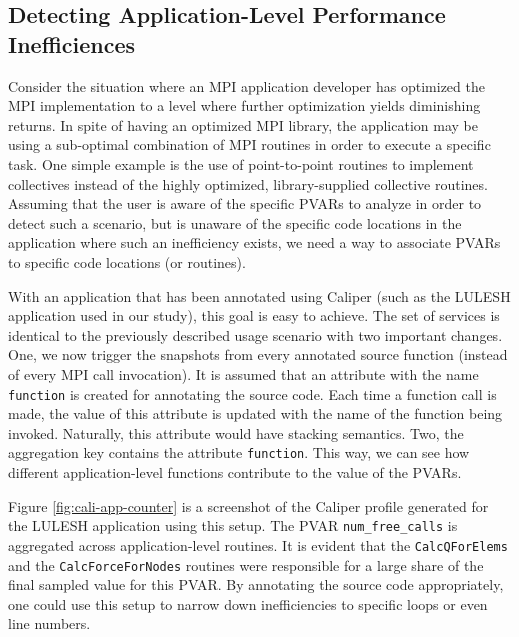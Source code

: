 \subsection{Detecting Application-Level Performance Inefficiences}
Consider the situation where an MPI application developer has optimized the MPI implementation to a level where further optimization yields diminishing returns. In spite of having an optimized MPI library, the application may be using a sub-optimal combination of MPI routines in order to execute a specific task. One simple example is the use of point-to-point routines to implement collectives instead of the highly optimized, library-supplied collective routines. Assuming that the user is aware of the specific PVARs to analyze in order to detect such a scenario, but is unaware of the specific code locations in the application where such an inefficiency exists, we need a way to associate PVARs to specific code locations (or routines).
\par With an application that has been annotated using Caliper (such as the LULESH application used in our study), this goal is easy to achieve. The set of services is identical to the previously described usage scenario with two important changes. One, we now trigger the snapshots from every annotated source function (instead of every MPI call invocation). It is assumed that an attribute with the name \verb+function+ is created for annotating the source code. Each time a function call is made, the value of this attribute is updated with the name of the function being invoked. Naturally, this attribute would have stacking semantics. Two, the aggregation key contains the attribute \verb+function+. This way, we can see how different application-level functions contribute to the value of the PVARs. 
\par Figure \ref{fig:cali-app-counter} is a screenshot of the Caliper profile generated for the LULESH application using this setup. The PVAR \verb+num_free_calls+ is aggregated across application-level routines. It is evident that the \verb+CalcQForElems+ and the \verb+CalcForceForNodes+ routines were responsible for a large share of the final sampled value for this PVAR. By annotating the source code appropriately, one could use this setup to narrow down inefficiencies to specific loops or even line numbers.

